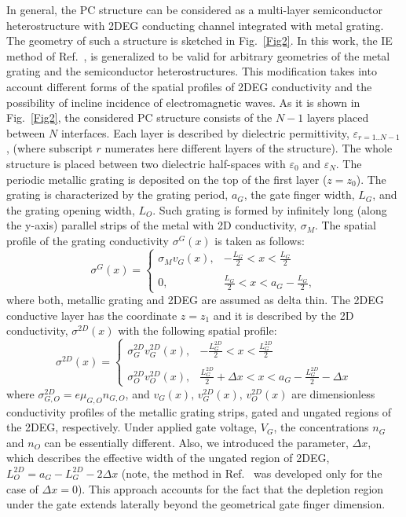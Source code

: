 \documentclass[%
 reprint,
 amsmath,amssymb,
 aps,
]{revtex4-2}
\begin{document}
In general, the PC structure can be considered as a multi-layer semiconductor heterostructure with 2DEG conducting channel integrated with metal grating. The geometry of such a structure is sketched in Fig.~\ref{Fig2}.
In this work, the IE method of Ref.~\cite{Popov2010}, is generalized to be valid for arbitrary geometries of the metal grating and the semiconductor heterostructures.
This modification takes into account different forms of the spatial profiles of 2DEG conductivity and the possibility of incline incidence of electromagnetic waves.  As it is shown in Fig.~\ref{Fig2}, the considered PC structure consists of the $N-1$ layers placed between $N$ interfaces. Each layer is described by dielectric permittivity, $\varepsilon_{r=1..N-1}$, (where subscript $r$
numerates here different layers of the structure). The whole structure is placed between two dielectric half-spaces with $\varepsilon_{0}$ and $\varepsilon_{N}$.  The periodic metallic grating is deposited on the top of the first layer ($z=z_0$). The grating is characterized by the grating period, $a_G$, the gate finger width, $L_G$, and the grating opening width, $L_O$. Such grating is formed by infinitely long (along the y-axis) parallel strips of the metal with 2D conductivity, $\sigma_{M}$. The spatial profile of the grating conductivity $\sigma^{G}(x)$ is taken as follows:
\begin{equation}\label{sigmaG}
\sigma^{G}(x)\!=\!\left\{\!\!
\begin{array}{ll}
\sigma_{M}v_G(x), &-\frac{L_{G}}{2}\!<\!x\!<\!\frac{L_{G}}{2}\\\\
0,&\frac{L_{G}}{2}\!<\!x\!<\!a_{G}\!-\frac{L_{G}}{2},
\end{array}
\right.
\end{equation}
where both, metallic grating and 2DEG are assumed as delta thin. The 2DEG conductive layer has the coordinate $z=z_1$ and it is described by the 2D conductivity, $\sigma^{2D}(x)$ with the following spatial profile:
\begin{equation}\label{sigma2D}
\sigma^{2D}(x)\!=\!\left\{\!\!
\begin{array}{ll}
\sigma^{2D}_{G}v_G^{2D}(x), &-\frac{L_{G}^{2D}}{2}\!<\!x\!<\!\frac{L_{G}^{2D}}{2}\\\\
\sigma^{2D}_{O}v_{O}^{2D}(x), &\frac{L^{2D}_{G}}{2}\!+\!\Delta x\!<\!x\!<\!a_{G}\!-\frac{L^{2D}_{G}}{2}-\!\Delta x
\end{array}
\right.
\end{equation}
where $\sigma^{2D}_{G,O}=e\mu_{G,O}n_{G,O}$, and $v_G(x),\,v_G^{2D}(x),\,v_{O}^{2D}(x)$ are dimensionless conductivity profiles of the metallic grating strips, gated and ungated regions of the 2DEG, respectively.
Under applied gate voltage, $V_G$, the concentrations $n_G$ and $n_O$ can be essentially different. Also, we introduced the parameter, $\Delta x$, which describes the effective width of the ungated region of 2DEG,  $L_{O}^{2D}=a_{G}-L^{2D}_{G}-2\Delta x$ (note, the method in Ref.~\cite{Popov2010} was developed only for the case of $\Delta x = 0$). This approach accounts for the fact that the depletion region under the gate extends laterally beyond the geometrical gate finger dimension.
\end{document}
